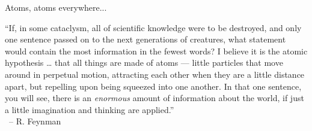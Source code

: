 \begin{frame}[fragile]{Atoms, atoms everywhere...}

    ``If, in some cataclysm, all of scientific knowledge were to be destroyed, and only one sentence passed on to the next generations of creatures, what statement would contain the most information in the fewest words? I believe it is the atomic hypothesis … that \textcolor{blue!80!white}{all things are made of atoms} — little particles that move around in perpetual motion, attracting each other when they are a little distance apart, but repelling upon being squeezed into one another. In that one sentence, you will see, there is an {\em enormous} amount of information about the world, if just a little \textcolor{red!80!yellow}{imagination and thinking} are applied.''\\
    \hfill\ -- R. Feynman


\end{frame}
